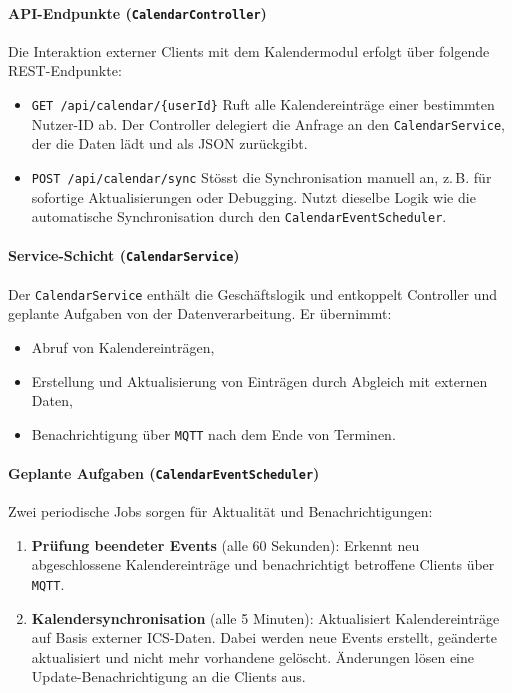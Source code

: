 \documentclass[12pt,a4paper]{report}
\begin{document}
\paragraph{API-Endpunkte (\texttt{CalendarController})}
    Die Interaktion externer Clients mit dem Kalendermodul erfolgt über folgende REST-Endpunkte:
    \begin{itemize}
        \item \texttt{GET /api/calendar/\{userId\}}
            Ruft alle Kalendereinträge einer bestimmten Nutzer-ID ab.
            Der Controller delegiert die Anfrage an den \texttt{CalendarService}, der die Daten lädt und als JSON zurückgibt.
        \item \texttt{POST /api/calendar/sync}
            Stösst die Synchronisation manuell an, z.\,B. für sofortige Aktualisierungen oder Debugging.
            Nutzt dieselbe Logik wie die automatische Synchronisation durch den \texttt{CalendarEventScheduler}.
    \end{itemize}

\paragraph{Service-Schicht (\texttt{CalendarService})}
    Der \texttt{CalendarService} enthält die Geschäftslogik und entkoppelt Controller und geplante Aufgaben von der Datenverarbeitung.
    Er übernimmt:
    \begin{itemize}
        \item Abruf von Kalendereinträgen,
        \item Erstellung und Aktualisierung von Einträgen durch Abgleich mit externen Daten,
        \item Benachrichtigung über \texttt{MQTT} nach dem Ende von Terminen.
    \end{itemize}

\paragraph{Geplante Aufgaben (\texttt{CalendarEventScheduler})}
    Zwei periodische Jobs sorgen für Aktualität und Benachrichtigungen:
    \begin{enumerate}
        \item \textbf{Prüfung beendeter Events} (alle 60 Sekunden):
            Erkennt neu abgeschlossene Kalendereinträge und benachrichtigt betroffene Clients über \texttt{MQTT}.
        \item \textbf{Kalendersynchronisation} (alle 5 Minuten):
            Aktualisiert Kalendereinträge auf Basis externer ICS-Daten.
            Dabei werden neue Events erstellt, geänderte aktualisiert und nicht mehr vorhandene gelöscht.
            Änderungen lösen eine Update-Benachrichtigung an die Clients aus.
    \end{enumerate}
\end{document}
